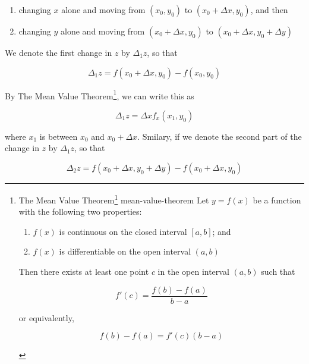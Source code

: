 \begin{enumerate}
    \item changing $x$ alone and moving from $(x_0, y_0)$ to $(x_0 + \Delta x, y_0)$, and then
    \item changing $y$ alone and moving from $(x_0 + \Delta x, y_0)$ to $(x_0 + \Delta x, y_0 + \Delta y)$
\end{enumerate}

We denote the first change in $z$ by $\Delta_1 z$, so that

\begin{equation}
    \Delta_1 z = f(x_0 + \Delta x, y_0) - f(x_0, y_0)
\end{equation}

By The Mean Value Theorem\footnote{
    \begin{Theorem}{
        The Mean Value Theorem\footnote{\href{https://trello.com/c/byu9Pyy8}{Calculus with Analytic Geometry by George F. Simmons, 2nd}, p. 76}
    }{mean-value-theorem}
        Let $y = f(x)$ be a function with the following two properties:

        \begin{enumerate}
            \item $f(x)$ is continuous on the closed interval $[a, b]$; and
            \item $f(x)$ is differentiable on the open interval $(a, b)$
        \end{enumerate}

        Then there exists at least one point $c$ in the open interval $(a, b)$ such that

        \[
            f'(c) = \frac{f(b) - f(a)}{b - a}
        \]

        or equivalently,

        \[
            f(b) - f(a) = f'(c)(b - a)
        \]
    \end{Theorem}
}, we can write this as

\begin{equation}\label{eq:first-change-z-mean-val-theo}
\Delta_1 z = \Delta x f_x(x_1, y_0)
\end{equation}

where $x_1$ is between $x_0$ and $x_0 + \Delta x$. Smilary, if we denote the second part of the change in $z$ by
$\Delta_1 z$, so that

\begin{equation}
    \Delta_2 z = f(x_0 + \Delta x, y_0 + \Delta y) - f(x_0 + \Delta x, y_0)
\end{equation}

